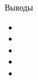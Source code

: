 \documentclass[9pt,pdf]{beamer} %
\begin{document}
\begin{frame}{Выводы}
\begin{itemize}
    \item 
    \item 
    \item 
    \item 
    \item 
\end{itemize}
\end{frame}
\end{document}

